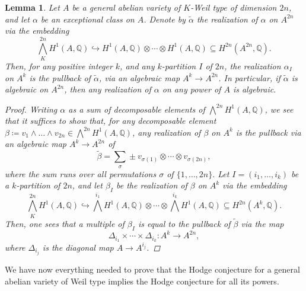 \documentclass[11pt,twoside,a4paper]{amsart}
\newcommand{\0}{\mathscr{O}}
\newcommand{\Q}{\mathbb{Q}}
\newcommand{\s}{\sigma}
\theoremstyle{plain}
\newtheorem{lem}[thm]{Lemma}
\theoremstyle{definition}
\theoremstyle{remark}
\begin{document}
\begin{lem}
\label{Lem.: realizations of exceptional classes are related}
Let $A$ be a general abelian variety of $K$-Weil type of dimension $2n$, and let $\alpha$ be an exceptional class on $A$. Denote by $\widetilde{\alpha}$ the realization of $\alpha$ on $A^{2n}$ via the embedding
\[
\textstyle
\bigwedge^{2n}_{K}H^1(A,\Q)\hookrightarrow H^1(A,\Q)\otimes\cdots\otimes H^1(A,\Q)\subseteq H^{2n}(A^{2n},\Q).
\]
Then, for any positive integer $k$, and any $k$-partition $I$ of $2n$, the realization $\alpha_I$ on $A^k$ is the pullback of $\widetilde{\alpha}$, via an algebraic map $A^k\rightarrow A^{2n}$. 
In particular, if $\widetilde{\alpha}$ is algebraic on $A^{2n}$, then any realization of $\alpha$ on any power of $A$ is algebraic.
\begin{proof}
Writing $\alpha$ as a sum of decomposable elements of $\bigwedge^{2n}H^1(A,\Q)$, we see that it suffices to show that, for any decomposable element $\beta\coloneqq v_1\wedge\ldots \wedge v_{2n}\in \bigwedge^{2n}H^1(A,\Q)$, any realization of $\beta$ on $A^k$ is the pullback via an algebraic map $A^k\rightarrow A^{2n}$ of 
\[\textstyle\widetilde{\beta}=\sum_\s \pm v_{\s(1)}\otimes\cdots\otimes v_{\s(2n)},\]
where the sum runs over all permutations $\s$ of $\{1,\ldots,2n\}.$ 
Let $I=(i_1,\ldots,i_k)$ be a $k$-partition of $2n$, and let $\beta_I$ be the realization of $\beta$ on $A^k$ via the embedding
\[
\textstyle
\bigwedge^{2n}_{K}H^1(A,\Q)\hookrightarrow \bigwedge^{i_1}H^1(A,\Q)\otimes \cdots\otimes \bigwedge^{i_k}H^1(A,\Q)\subseteq H^{2n}(A^k,\Q).
\]
Then, one sees that a multiple of $\beta_I$ is equal to the pullback of $\widetilde{\beta}$ via the map 
\[\Delta_{i_1}\times \cdots\times\Delta_{i_k}\colon A^{k}\rightarrow A^{2n},\]
where $\Delta_{i_j}$ is the diagonal map $A\rightarrow A^{i_j}$.
\end{proof}
\end{lem}
We have now everything needed to prove that the Hodge conjecture for a general abelian variety of Weil type implies the Hodge conjecture for all its powers.
\end{document}
